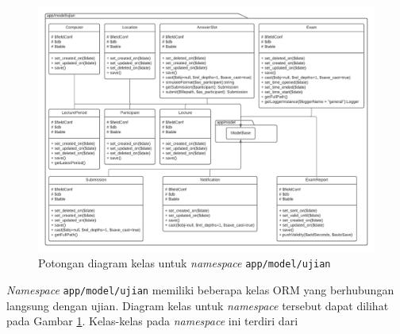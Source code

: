     
    \begin{figure}
        \centering
        \includegraphics[width=0.8\paperheight]{Gambar/classmap-be/Classmap - app-model-ujian.pdf}
        \caption{Potongan diagram kelas untuk \textit{namespace} \texttt{app/model/ujian}}
        \label{fig:classmap_app-model-ujian}
    \end{figure}
    \textit{Namespace} \texttt{app/model/ujian} memiliki beberapa kelas ORM yang berhubungan langsung
    dengan ujian. Diagram kelas untuk \textit{namespace} tersebut dapat dilihat pada Gambar
    \ref{fig:classmap_app-model-ujian}. Kelas-kelas pada \textit{namespace} ini terdiri dari

